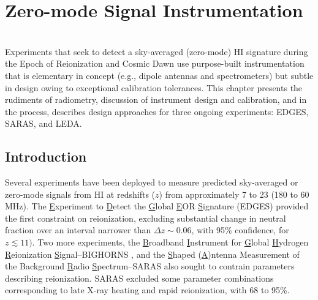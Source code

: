 
%
%

\chapter{Zero-mode Signal Instrumentation}

\begin{bf}
\author{  
L. J. Greenhill 
(Harvard-Smithsonian Center for Astrophysics) \\
R. Subrahmanyan 
(Raman Research Institute)   
}\\



\noindent
Experiments that seek to detect a sky-averaged (zero-mode) HI signature during the Epoch of Reionization and Cosmic Dawn use purpose-built instrumentation that is elementary in concept (e.g., dipole antennas and spectrometers) but subtle in design owing to exceptional calibration tolerances.  This chapter presents the rudiments of radiometry, discussion of instrument design and calibration, and in the process, describes design approaches for three ongoing experiments: EDGES, SARAS, and LEDA. \\

\end{bf}

\section{Introduction}

Several experiments have been deployed to measure predicted sky-averaged or zero-mode signals from HI at redshifts ($z$) from approximately 7 to 23 (180 to 60 MHz). The {\underline E}xperiment to {\underline D}etect the {\underline G}lobal {\underline E}OR {\underline S}ignature (EDGES) \cite{bowman08,rogers12} provided the first constraint on reionization, excluding substantial change in neutral fraction over an interval narrower than $\Delta z\sim 0.06$, with 95\% confidence, for $z\lesssim11)$. Two more experiments, the {\underline B}roadband {\underline I}nstrument for {\underline G}lobal {\underline H}ydrogen {\underline R}eionization {\underline S}ignal--BIGHORNS \cite{sokolowski15}, and the {\underline S}haped (\underline A)ntenna Measurement of the Background {\underline Ra}dio {\underline S}pectrum--SARAS \cite{patra13, singh17, singh18} also sought to contrain parameters describing reionization.  SARAS excluded some parameter combinations corresponding to late X-ray heating and rapid reionization, with 68 to 95\%.  

